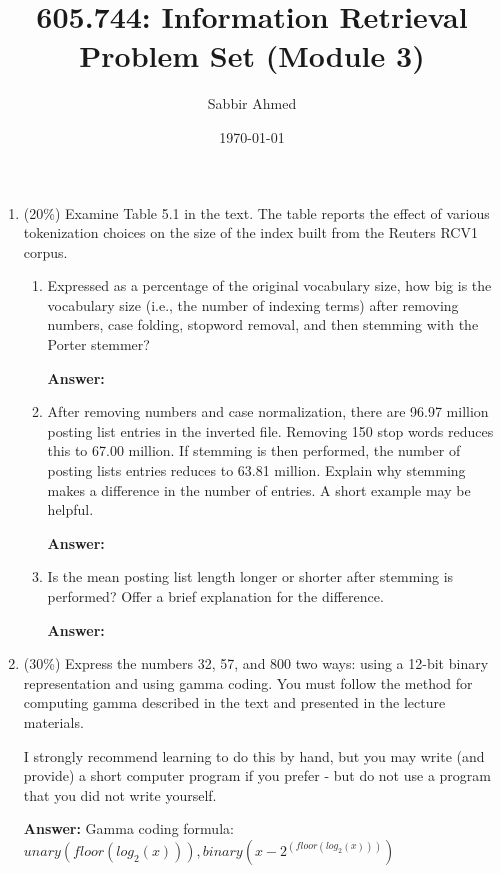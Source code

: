 \documentclass[11pt]{article}
\title{605.744: Information Retrieval \\ Problem Set (Module 3)}
\author{Sabbir Ahmed}
\date{\today}
\begin{document}
\maketitle	

    \begin{enumerate}

        \item (20\%) Examine Table 5.1 in the text. The table reports the effect of various tokenization choices on the size of the index built from the Reuters RCV1 corpus.

        \begin{enumerate}
            \item Expressed as a percentage of the original vocabulary size, how big is the vocabulary size (i.e., the number of indexing terms) after removing numbers, case folding, stopword removal, and then stemming with the Porter stemmer?

            \textbf{Answer:}

            \item After removing numbers and case normalization, there are 96.97 million posting list entries in the inverted file. Removing 150 stop words reduces this to 67.00 million. If stemming is then performed, the number of posting lists entries reduces to 63.81 million. Explain why stemming makes a difference in the number of entries. A short example may be helpful.

            \textbf{Answer:}

            \item Is the mean posting list length longer or shorter after stemming is performed? Offer a brief explanation for the difference.

            \textbf{Answer:}

        \end{enumerate}

        \item (30\%) Express the numbers {32, 57, and 800} two ways: using a 12-bit binary representation and using gamma coding. You must follow the method for computing gamma described in the text and presented in the lecture materials.
        
        I strongly recommend learning to do this by hand, but you may write (and provide) a short computer program if you prefer - but do not use a program that you did not write yourself.


        \textbf{Answer:}
        Gamma coding formula: $unary(floor(log_2(x))), binary(x-2^{(floor(log_2(x)))})$


\end{enumerate}
\end{document}
